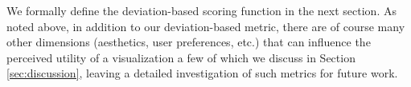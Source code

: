 We formally define the deviation-based scoring function in the next
section.  As noted above, in addition to our deviation-based metric,
there are of course many other dimensions (aesthetics, user
preferences, etc.) that can influence the perceived utility of a
visualization a few of which we discuss in Section
\ref{sec:discussion}, leaving a detailed investigation of such metrics
for future work.






